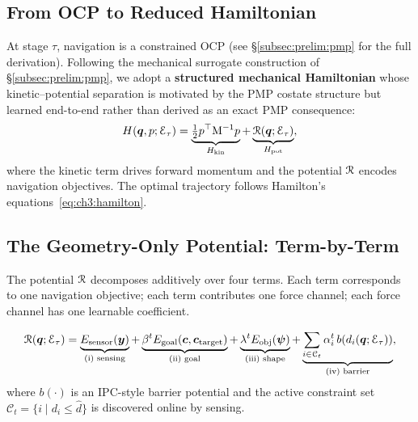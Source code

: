 \subsection{From OCP to Reduced Hamiltonian}
\label{subsec:ch3:ocp}

At stage $\tau$, navigation is a constrained OCP
(see §\ref{subsec:prelim:pmp} for the full derivation).
Following the mechanical surrogate construction of
§\ref{subsec:prelim:pmp}, we adopt a
\textbf{structured mechanical Hamiltonian} whose kinetic--potential
separation is motivated by the PMP costate structure but learned
end-to-end rather than derived as an exact PMP consequence:
\begin{equation}
  H(\boldsymbol{q},p;\mathcal{E}_\tau)
  = \underbrace{\tfrac{1}{2}p^\top\mathrm{M}^{-1}p}_{H_{\mathrm{kin}}}
  + \underbrace{\mathcal{R}(\boldsymbol{q};\mathcal{E}_\tau)}_{H_{\mathrm{pot}}},
  \label{eq:ch3:ham}
\end{equation}
where the kinetic term drives forward momentum and the potential
$\mathcal{R}$ encodes navigation objectives.
The optimal trajectory follows Hamilton's equations~\eqref{eq:ch3:hamilton}.

\subsection{The Geometry-Only Potential: Term-by-Term}
\label{subsec:ch3:potential}

The potential $\mathcal{R}$ decomposes additively over four terms.
Each term corresponds to one navigation objective; each term contributes
one force channel; each force channel has one learnable coefficient.

\begin{equation}
  \mathcal{R}(\boldsymbol{q};\mathcal{E}_\tau)
  = \underbrace{E_{\mathrm{sensor}}(\boldsymbol{y})}_{\text{(i) sensing}}
  + \underbrace{\beta^t E_{\mathrm{goal}}(\boldsymbol{c},\boldsymbol{c}_{\mathrm{target}})}_{\text{(ii) goal}}
  + \underbrace{\lambda^t E_{\mathrm{obj}}(\boldsymbol{\psi})}_{\text{(iii) shape}}
  + \underbrace{\sum_{i\in\mathcal{C}_t} \alpha_i^t\,b(d_i(\boldsymbol{q};\mathcal{E}_\tau))}_{\text{(iv) barrier}},
  \label{eq:ch3:potential}
\end{equation}
where $b(\cdot)$ is an IPC-style barrier potential and the active
constraint set $\mathcal{C}_t = \{i \mid d_i \leq \hat{d}\}$ is
discovered online by sensing.


